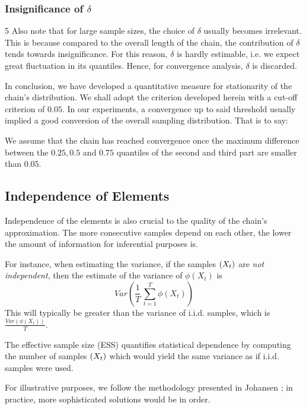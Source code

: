 \subsubsection*{Insignificance of $\delta$}5
Also note that for large sample sizes, the choice of $\delta$ usually becomes irrelevant. This is because compared to the overall length of the chain, the contribution of $\delta$ tends towards insignificance. For this reason, $\delta$ is hardly estimable, i.e. we expect great fluctuation in its quantiles. Hence, for convergence analysis, $\delta$ is discarded. 
\vspace{0.5cm}

In conclusion, we have developed a quantitative measure for stationarity of the chain's distribution. 
We shall adopt the criterion developed herein with a cut-off criterion of $0.05$. In our experiments, a convergence up to said threshold usually implied a good conversion of the overall sampling distribution.
 That is to say: 

\begin{center}
We assume that the chain has reached convergence once the maximum difference between the $0.25, 0.5$ and $0.75$ quantiles of the second and third part are smaller than $0.05$. 
\end{center}


\subsection{Independence of Elements}

Independence of the elements is also crucial to the quality of the chain's approximation. The more consecutive samples depend on each other, the lower the amount of information for inferential purposes is. 

For instance, when estimating the variance, if the samples $\left(X_t\right)$ are \textit{not independent}, then the estimate of the variance of $\phi(X_t)$ is 
\[
Var \left(	\frac{1}{T} \, \sum\limits_{t=1}^T \phi(X_t)\right)
\]
 This will typically be greater than the variance of i.i.d. samples, which is $\frac{Var\left(\phi(X_t) \right)}{T}$. 

The effective sample size (ESS) quantifies statistical dependence by computing the number of samples $\left(X_t\right)$ which would yield the same variance as if i.i.d. samples were used. 

For illustrative purposes, we follow the methodology presented in Johansen \cite{mcnotes}; in practice, more sophisticated solutions would be in order. 

